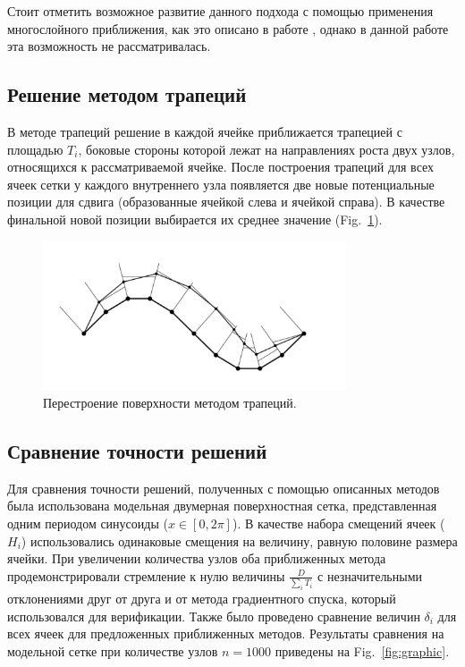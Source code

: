 \documentclass[
11pt,%
tightenlines,%
twoside,%
onecolumn,%
nofloats,%
nobibnotes,%
nofootinbib,%
superscriptaddress,%
noshowpacs,%
centertags]%
{revtex4}
\begin{document}
Стоит отметить возможное развитие данного подхода с помощью применения многослойного приближения, как это описано в работе \cite{Bourgault_Cote}, однако в данной работе эта возможность не рассматривалась.

\subsection{Решение методом трапеций}

В методе трапеций решение в каждой ячейке приближается трапецией с площадью $T_i$, боковые стороны которой лежат на направлениях роста двух узлов, относящихся к рассматриваемой ячейке.
После построения трапеций для всех ячеек сетки у каждого внутреннего узла появляется две новые потенциальные позиции для сдвига (образованные ячейкой слева и ячейкой справа).
В качестве финальной новой позиции выбирается их среднее значение (Fig.~\ref{fig:grid_trapeziums}).

\begin{figure}[h]
\setcaptionmargin{5mm}
\onelinecaptionstrue
\includegraphics[width=0.8\textwidth]{pics/grid_trapeziums.pdf}
\caption{Перестроение поверхности методом трапеций.}
\label{fig:grid_trapeziums}
\end{figure}

\subsection{Сравнение точности решений}

Для сравнения точности решений, полученных с помощью описанных методов была использована модельная двумерная поверхностная сетка, представленная одним периодом синусоиды ($x \in [0, 2 \pi]$).
В качестве набора смещений ячеек ($H_i$) использовались одинаковые смещения на величину, равную половине размера ячейки.
При увеличении количества узлов оба приближенных метода продемонстрировали стремление к нулю величины $\frac{D}{\sum_i{T_i}}$ с незначительными отклонениями друг от друга и от метода градиентного спуска, который использовался для верификации.
Также было проведено сравнение величин $\delta_i$ для всех ячеек для предложенных приближенных методов.
Результаты сравнения на модельной сетке при количестве узлов $n = 1000$ приведены на Fig.~\ref{fig:graphic}.
\end{document}
